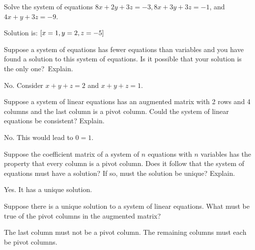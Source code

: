 \begin{ex}
  Solve the system of equations
  $8x+2y+3z=-3,8x+3y+3z=-1$, and $4x+y+3z=-9$.
  \begin{sol}
    Solution is: $\left[x=1,y=2,z=-5\right] $
  \end{sol}
\end{ex}

\begin{ex}
  Suppose a system of equations has fewer equations than variables and
  you have found a solution to this system of equations. Is it possible that
  your solution is the only one?\ Explain.
  \begin{sol}
    No. Consider $x+y+z=2$ and $x+y+z=1$.
  \end{sol}
\end{ex}

\begin{ex}
  Suppose a system of linear equations has an augmented
  matrix with 2 rows and 4 columns and the last column is a pivot
  column. Could the system of linear equations be consistent? Explain.
  \begin{sol}
    No. This would lead to $0=1$.
  \end{sol}
\end{ex}

\begin{ex}
  Suppose the coefficient matrix of a system of $n$ equations with $n$
  variables has the property that every column is a pivot column. Does it
  follow that the system of equations must have a solution? If so, must the
  solution be unique? Explain.
  \begin{sol}
    Yes. It has a unique solution.
  \end{sol}
\end{ex}

\begin{ex}
  Suppose there is a unique solution to a system of linear equations.
  What must be true of the pivot columns in the augmented matrix?
  \begin{sol}
    The last column must not be a pivot column. The remaining columns must each be pivot
    columns.
  \end{sol}
\end{ex}

